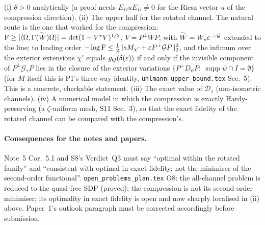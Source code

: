 \documentclass[11pt,a4paper]{article}
\begin{document}
\begin{verdictgap}
(i) \(\theta>0\) analytically (a proof needs \(E_DuE_D\ne0\) for the Riesz vector \(u\) of the
compression direction).  (ii) The upper half for the rotated channel.  The natural route is the one
that worked for the compression: \(\operatorname{F}\ge|\langle\Omega,\Gamma(\widetilde W)\Omega\rangle|=\det(1-V^*V)^{1/2}\),
\(V=P^\perp\widetilde WP\), with \(\widetilde W=W_{s}e^{-\varepsilon\mathcal G}\) extended to the line; to leading order
\(-\log\operatorname{F}\le\frac12\|sM_{\chi'}+\varepsilon P^\perp\mathcal GP\|_2^2\), and the infimum over the exterior
extensions \(\chi'\) equals \(g_Q(\delta(\varepsilon))\) if and only if the invisible component of
\(P^\perp\mathcal G_*P\) lies in the closure of the exterior variations \(\{P^\perp D_\psi P:\ \operatorname{supp}\psi\cap I=\emptyset\}\)
(for \(M\) itself this is P1's three-way identity, \texttt{uhlmann\_upper\_bound.tex} Sec.~5).  This is a
concrete, checkable statement.  (iii) The exact value of \(\mathcal D_z\) (non-isometric channels).
(iv) A numerical model in which the compression is exactly Hardy-preserving (a \(\zeta\)-uniform mesh,
S11 Sec.~3), so that the exact fidelity of the rotated channel can be compared with the compression's.
\end{verdictgap}

\paragraph{Consequences for the notes and papers.}  Note~5 Cor.~5.1 and S8's Verdict~Q3 must say
``optimal within the rotated family'' and ``consistent with optimal in exact fidelity; not the
minimiser of the second-order functional''.  \texttt{open\_problems\_plan.tex} O8: the all-channel
problem is reduced to the quasi-free SDP (proved); the compression is not its second-order
minimiser; its optimality in exact fidelity is open and now sharply localised in (ii) above.
Paper~1's outlook paragraph must be corrected accordingly before submission.
\end{document}
